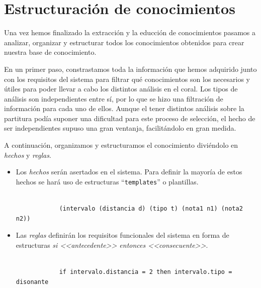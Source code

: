 \section{Estructuración de conocimientos} 

Una vez hemos finalizado la extracción y la educción de conocimientos pasamos a analizar, organizar y estructurar todos los conocimientos obtenidos para crear nuestra base de conocimiento.

En un primer paso, constrastamos toda la información que hemos adquirido junto con los requisitos del sistema para filtrar qué conocimientos son los necesarios y útiles para poder llevar a cabo los distintos análisis en el coral. Los tipos de análisis son independientes entre sí, por lo que se hizo una filtración de información para cada uno de ellos. Aunque el tener distintos análisis sobre la partitura podía suponer una dificultad para este proceso de selección, el hecho de ser independientes supuso una gran ventanja, facilitándolo en gran medida. 

A continuación, organizamos y estructuramos el conocimiento diviéndolo en \textit{hechos} y \textit{reglas}. 

\begin{itemize}

	\item Los \textit{hechos} serán asertados en el sistema. Para definir la mayoría de estos hechos se hará uso de estructuras ``\texttt{templates}'' o plantillas.

	\bigskip

		\begin{lstlisting}

			(intervalo (distancia d) (tipo t) (nota1 n1) (nota2 n2))

		\end{lstlisting}

	\bigskip

	\item Las \textit{reglas} definirán los requisitos funcionales del sistema en forma de estructuras \textit{si <<antecedente>> entonces <<consecuente>>}. 

	\bigskip

		\begin{lstlisting}

			if intervalo.distancia = 2 then intervalo.tipo = disonante

		\end{lstlisting}

	\bigskip

\end{itemize} 

